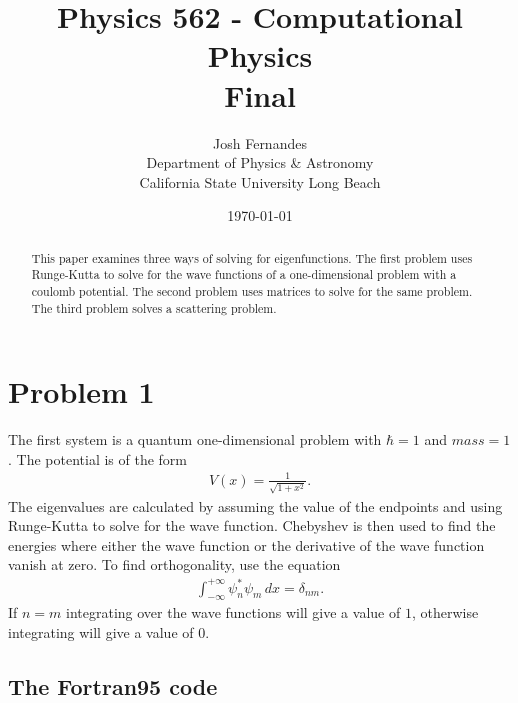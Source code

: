 \documentclass[12pt]{article}
\begin{document}




\title{Physics 562 - Computational Physics\\[.5cm]
Final
}
\author{Josh Fernandes\\
Department of Physics \& Astronomy\\
California State University Long Beach}
\date{\today}

  
\maketitle



\begin{abstract}
This paper examines three ways of solving for eigenfunctions. The first problem uses Runge-Kutta to solve for the wave functions of a one-dimensional problem with a coulomb potential. The second problem uses matrices to solve for the same problem. The third problem solves a scattering problem.
\end{abstract}


\section{Problem 1}

The first system is a quantum one-dimensional problem with $\hbar=1$ and $mass=1$. The potential is of the form
\begin{gather}
V(x)=\frac{1}{\sqrt{1+x^2}}.
\end{gather}
The eigenvalues are calculated by assuming the value of the endpoints and using Runge-Kutta to solve for the wave function. Chebyshev is then used to find the energies where either the wave function or the derivative of the wave function vanish at zero. To find orthogonality, use the equation
\begin{gather}
\int_{-\infty}^{+\infty} \psi_n^* \psi_m \,dx = \delta_{nm}.
\label{equationone}
\end{gather}
If $n=m$ integrating over the wave functions will give a value of $1$, otherwise integrating will give a value of $0$.

\subsection{The Fortran95 code}
\end{document}
